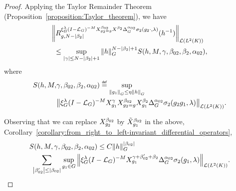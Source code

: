 \begin{proof}
    Applying the Taylor Remainder Theorem (Proposition~\ref{proposition:Taylor_theorem}),
    we have
    \begin{align*}
        &\norm [\Lin {\Lebesgue 2 \CompactGroup}] {\TaylorRemainder {\Rep \lambda \BesselPotentialSquared {-M} \LeftDifferentialOperator [g_2 = g] {\beta_{02}} \LeftDifferentialOperator {\beta_2} \DifferenceOperatorOrder {\alpha_{02}} \sigma_2(g_2 \dummy, \lambda)} g {N - \abs {\beta_2}} (h^{-1})}\\
        &\ \leq
        \sup_{\abs \gamma \leq N - \abs {\beta_2} + 1}
        \norm [\Group] h^{N - \abs {\beta_2} + 1}
        S(h, M, \gamma, \beta_{02}, \beta_2, \alpha_{02}),
    \end{align*}
    where
    \begin{align*}
        S(h, M, &\gamma, \beta_{02}, \beta_2, \alpha_{02}) \defeq
        \sup_{\norm [\Group] {g_1} \leq \eta \norm [\Group] h}\\
        &\norm [\Lin {\Lebesgue 2 \CompactGroup}] {%
            \Rep \lambda \BesselPotentialSquared {-M}
            \LeftDifferentialOperator [g_1] {\gamma}
            \LeftDifferentialOperator [g_2 = g] {\beta_{02}}
            \LeftDifferentialOperator [g_1] {\beta_2}
            \DifferenceOperatorOrder {\alpha_{02}}
            \sigma_2(g_2 g_1, \lambda)
        }.
    \end{align*}

    Observing that we can replace $\LeftDifferentialOperator [g_2] {\beta_{02}}$ by $\RightDifferentialOperator [g_1] {\beta_{02}}$ in the above,
    Corollary~\ref{corollary:from_right_to_left-invariant_differential_operators},
    \begin{align}
        &S(h, M, \gamma, \beta_{02}, \beta_2, \alpha_{02})
        \leq C \norm [\Group] h^{\abs {\beta_{02}}} \notag\\
        &\ \sum_{\abs {\beta'_{02}} \leq \abs {\beta_{02}}}
        \sup_{g_1 \in \Group}
        \norm [\Lin {\Lebesgue 2 \CompactGroup}] {%
            \Rep \lambda \BesselPotentialSquared {-M}
            \LeftDifferentialOperator [g_1] {\gamma + \beta'_{02} + \beta_2}
            \DifferenceOperatorOrder {\alpha_{02}}
            \sigma_2(g_1, \lambda)
        }.
        \label{eq:composition_formula:bound_on_S}
    \end{align}


\end{proof}
